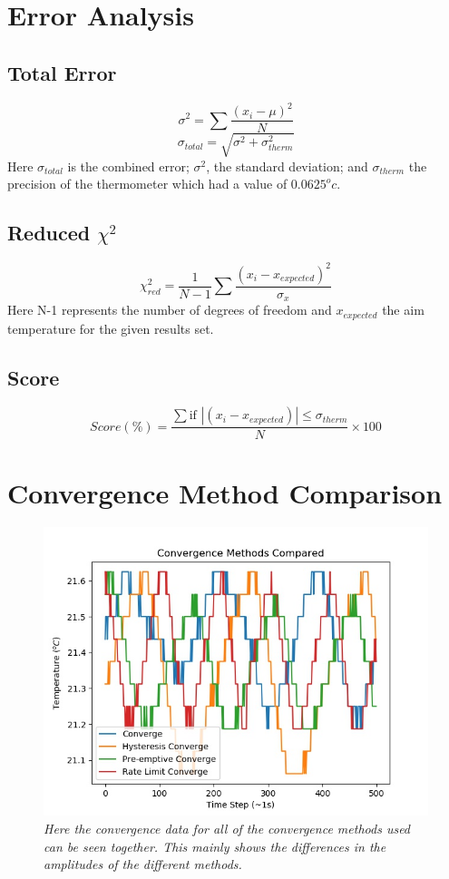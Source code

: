 \documentclass[10pt]{article}
\begin{document}
\section{Error Analysis}\label{app:errors}
\subsection{Total Error}
\begin{equation}
    \sigma^2 = \sum \frac{(x_i - \mu)^2}{N}
\end{equation}
\begin{equation}
    \sigma_{total} = \sqrt{\sigma^2 + \sigma_{therm}^2}
\end{equation}
Here $\sigma_{total}$ is the combined error; $\sigma^2$, the standard deviation; and $\sigma_{therm}$ the precision of the thermometer which had a value of $0.0625^oc$.
\subsection{Reduced $\chi^2$}
\begin{equation}
    \chi_{red}^2 = \frac{1}{N-1}\sum \frac{(x_i - x_{expected})^2}{\sigma_{x}}
\end{equation}
Here N-1 represents the number of degrees of freedom and $x_{expected}$ the aim temperature for the given results set.
\subsection{Score}
\begin{equation}
    Score(\%) = \frac{\sum \text{if } |(x_i - x_{expected})| \leq \sigma_{therm}}{N}\times 100
\end{equation}
\newpage
\section{Convergence Method Comparison}\label{app:comparison}
\begin{figure}[h!]
    \centering
    \includegraphics[scale=0.75]{comparison.jpg}
    \caption{\it{Here the convergence data for all of the convergence methods used can be seen together. This mainly shows the differences in the amplitudes of the different methods.}}
    \label{fig:comparison}
\end{figure}
\end{document}
